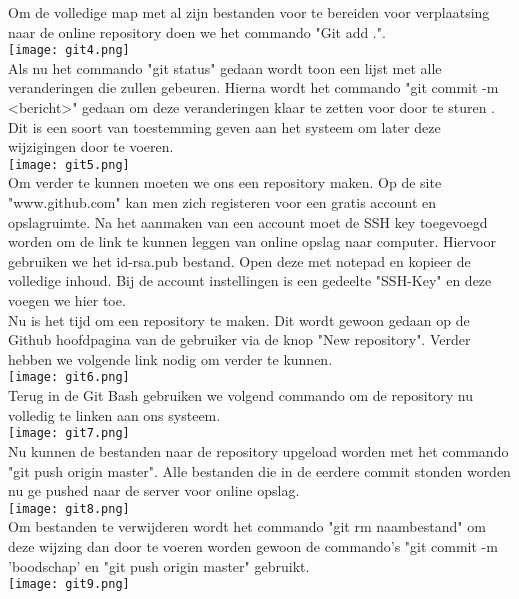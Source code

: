Om de volledige map met al zijn bestanden voor te bereiden voor verplaatsing naar de online repository doen we het commando "Git add .".\\
\texttt{[image: git4.png]}\\

Als nu het commando "git status" gedaan wordt toon een lijst met alle veranderingen die zullen gebeuren. Hierna wordt het commando "git commit -m <bericht>" gedaan om deze veranderingen klaar te zetten voor door te sturen . Dit is een soort van toestemming geven aan het systeem om later deze wijzigingen door te voeren.\\
\texttt{[image: git5.png]}\\

Om verder te kunnen moeten we ons een repository maken. Op de site "www.github.com" kan men zich registeren voor een gratis account en opslagruimte. Na het aanmaken van een account moet de SSH key toegevoegd worden om de link te kunnen leggen van online opslag naar computer. Hiervoor gebruiken we het id-rsa.pub bestand. Open deze met notepad en kopieer de volledige inhoud. Bij de account instellingen is een gedeelte "SSH-Key" en deze voegen we hier toe.\\

Nu is het tijd om een repository te maken. Dit wordt gewoon gedaan op de Github hoofdpagina van de gebruiker via de knop "New repository". Verder hebben we volgende link nodig om verder te kunnen.\\
\texttt{[image: git6.png]}\\

Terug in de Git Bash gebruiken we volgend commando om de repository nu volledig te linken aan ons systeem.\\
\texttt{[image: git7.png]}\\

Nu kunnen de bestanden naar de repository upgeload worden met het commando "git push origin master". Alle bestanden die in de eerdere commit stonden worden nu ge pushed naar de server voor online opslag.\\
\texttt{[image: git8.png]}\\

Om bestanden te verwijderen wordt het commando "git rm naambestand" om deze wijzing dan door te voeren worden gewoon de commando's "git commit -m 'boodschap' en "git push origin master" gebruikt.\\
\texttt{[image: git9.png]}\\



